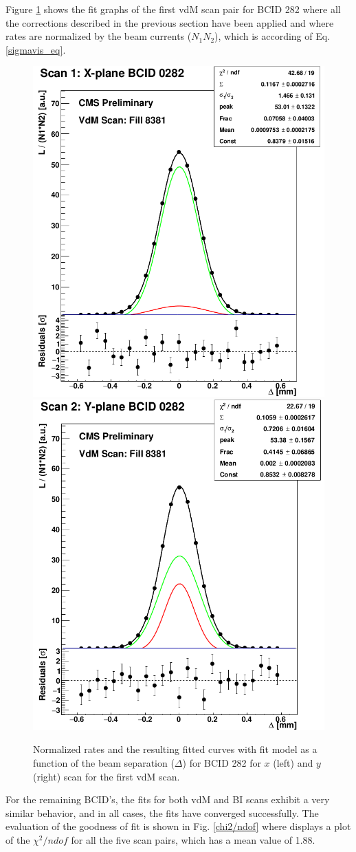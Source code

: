 Figure \ref{vdM1_282_XYscan} shows the fit graphs of the first vdM scan pair for BCID 282 where  all the corrections described in the previous section have been applied and where  rates are normalized by the beam currents ($N_{1}N_{2}$), which is according of Eq. \ref{sigmavis_eq}.

\begin{center}
\begin{figure}[h!]
\centering
\includegraphics[width=.40\textwidth]{Chapter4/xscan.png}
\includegraphics[width=.40\textwidth]{Chapter4/yscan.png}\\
\caption[vdM1 BCID 282]{Normalized rates and the resulting fitted curves with  fit model as a function of the beam separation ($\Delta$) for BCID 282 for $x$ (left) and $y$ (right) scan for the first vdM scan.}
\label{vdM1_282_XYscan}
\end{figure}
\end{center}
For the remaining BCID's, the fits for both vdM and BI scans exhibit a very similar behavior, and in all cases, the fits have converged successfully. The evaluation of the goodness of fit is shown in Fig. \ref{chi2/ndof} where displays a plot of the $\chi^{2}/ndof$ for all the five scan pairs, which has a mean value of 1.88.


